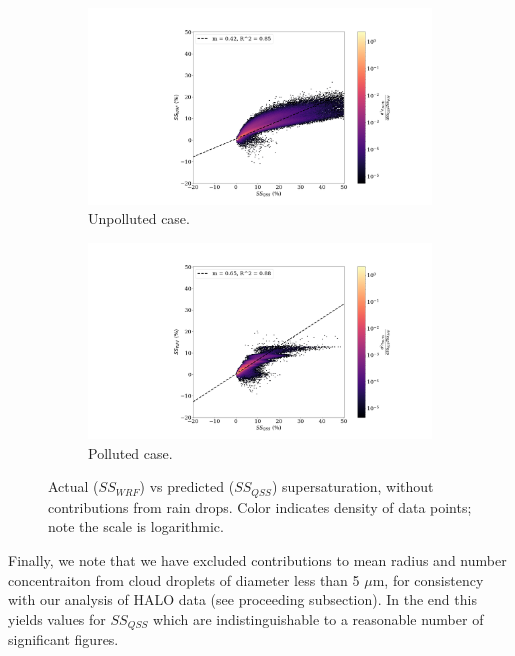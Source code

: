 \documentclass{article}
\begin{document}
\begin{figure}[ht]
	\centering
	\begin{subfigure}{0.7\textwidth}
		\includegraphics[width=\textwidth]{revmywrf/v5_FINAL_heatmap_ss_qss_vs_ss_wrf_Unpolluted_figure.png}
		\caption{Unpolluted case.}
		\label{wrfvsqssunpollv5}
	\end{subfigure}
	\begin{subfigure}{0.7\textwidth}
		\includegraphics[width=\textwidth]{revmywrf/v5_FINAL_heatmap_ss_qss_vs_ss_wrf_Polluted_figure.png}
		\caption{Polluted case.}
		\label{wrfvsqsspollv5}
	\end{subfigure}
	\caption{Actual ($SS_{WRF}$) vs predicted ($SS_{QSS}$) supersaturation, without contributions from rain drops. Color indicates density of data points; note the scale is logarithmic.}
	\label{wrfvsqssv5}
\end{figure}

Finally, we note that we have excluded contributions to mean radius and number concentraiton from cloud droplets of diameter less than 5 $\mu$m, for consistency with our analysis of HALO data (see proceeding subsection). In the end this yields values for $SS_{QSS}$ which are indistinguishable to a reasonable number of significant figures.
\end{document}
